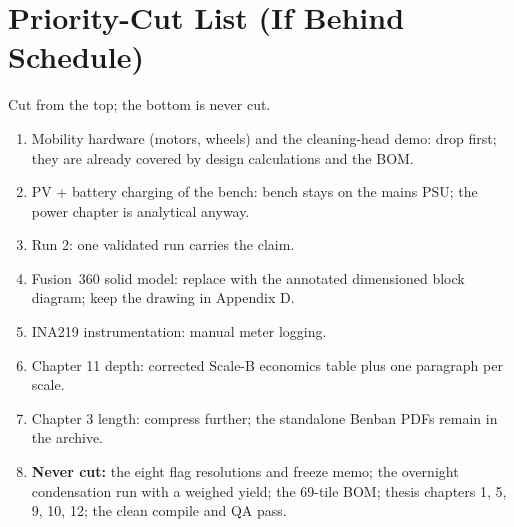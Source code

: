 \documentclass[11pt,a4paper]{article}
\begin{document}
\section{Priority-Cut List (If Behind Schedule)}
\label{sec:cuts}
Cut from the top; the bottom is never cut.
\begin{enumerate}[leftmargin=*]
  \item Mobility hardware (motors, wheels) and the cleaning-head demo: drop
        first; they are already covered by design calculations and the BOM.
  \item PV + battery charging of the bench: bench stays on the mains PSU; the
        power chapter is analytical anyway.
  \item Run 2: one validated run carries the claim.
  \item Fusion~360 solid model: replace with the annotated dimensioned block
        diagram; keep the drawing in Appendix D.
  \item INA219 instrumentation: manual meter logging.
  \item Chapter 11 depth: corrected Scale-B economics table plus one paragraph
        per scale.
  \item Chapter 3 length: compress further; the standalone Benban PDFs remain
        in the archive.
  \item \textbf{Never cut:} the eight flag resolutions and freeze memo; the
        overnight condensation run with a weighed yield; the 69-tile BOM;
        thesis chapters 1, 5, 9, 10, 12; the clean compile and QA pass.
\end{enumerate}

\end{document}
